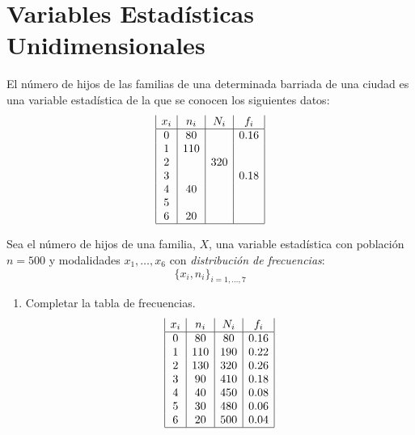 \section{Variables Estadísticas Unidimensionales}


\begin{ejercicio}
    El número de hijos de las familias de una determinada barriada de una ciudad es una variable estadística de la que se conocen los siguientes datos:
    \begin{equation*}
        \begin{array}{|c|c|c|c|}
            x_i & n_i & N_i & f_i \\ \hline
            0 & 80 & & 0.16 \\
            1 & 110 & & \\
            2 & & 320 & \\
            3 & & & 0.18\\
            4 & 40 & & \\
            5 & & & \\
            6 & 20 & & \\ \hline
        \end{array}
    \end{equation*}

    Sea el número de hijos de una familia, $X$, una variable estadística con población $n=500$ y modalidades $x_1, \dots, x_6$ con \emph{distribución de frecuencias}:
    $$\{x_i, n_i\}_{i=1, \dots, 7}$$
    \begin{enumerate}
        \item Completar la tabla de frecuencias.
        \begin{equation*}
            \begin{array}{|c|c|c|c|}
                x_i & n_i & N_i & f_i \\ \hline
                0 & 80 & 80 & 0.16 \\
                1 & 110 & 190 & 0.22 \\
                2 & 130 & 320 & 0.26\\
                3 & 90 & 410 & 0.18\\
                4 & 40 & 450 & 0.08\\
                5 & 30 & 480 & 0.06\\
                6 & 20 & 500 & 0.04\\ \hline
            \end{array}
        \end{equation*}


\end{enumerate}
\end{ejercicio}
